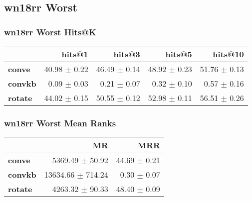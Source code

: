 \documentclass{article}
\begin{document}
\subsection{wn18rr Worst}
\subsubsection{wn18rr Worst Hits@K}
    \begin{center}
    \begin{tabular}{lrrrr}
\toprule
{} &        hits@1 &        hits@3 &        hits@5 &       hits@10 \\
\midrule
\textbf{conve } &  40.98 $\pm$ 0.22 &  46.49 $\pm$ 0.14 &  48.92 $\pm$ 0.23 &  51.76 $\pm$ 0.13 \\
\textbf{convkb} &   0.09 $\pm$ 0.03 &   0.21 $\pm$ 0.07 &   0.32 $\pm$ 0.10 &   0.57 $\pm$ 0.16 \\
\textbf{rotate} &  44.02 $\pm$ 0.15 &  50.55 $\pm$ 0.12 &  52.98 $\pm$ 0.11 &  56.51 $\pm$ 0.26 \\
\bottomrule
\end{tabular}

    \end{center}
\subsubsection{wn18rr Worst Mean Ranks}
    \begin{center}
    \begin{tabular}{lrr}
\toprule
{} &                 MR &           MRR \\
\midrule
\textbf{conve } &    5369.49 $\pm$ 50.92 &  44.69 $\pm$ 0.21 \\
\textbf{convkb} &  13634.66 $\pm$ 714.24 &   0.30 $\pm$ 0.07 \\
\textbf{rotate} &    4263.32 $\pm$ 90.33 &  48.40 $\pm$ 0.09 \\
\bottomrule
\end{tabular}

    \end{center}
\end{document}
